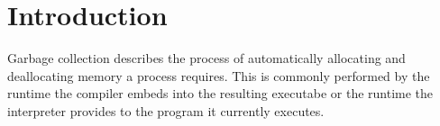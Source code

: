 \section{Introduction}

Garbage collection describes the process of automatically allocating and
deallocating memory a process requires. \cite{python_gcdesign_2023} This is
commonly performed by the runtime the compiler embeds into the resulting
executabe or the runtime the interpreter provides to the program it currently
executes. \cite{go_gcguide_2022, python_gclib_2023}
